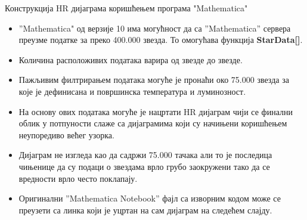 \documentclass[aspectratio=169, xcolor=table, 10pt]{beamer}
\begin{document}
\begin{frame}{Конструкција HR дијаграма коришћењем програма "Mathematica"}
  \begin{itemize}
    \item ”Mathematica" од верзије 10 има могућност да са ”Mathematica” сервера преузме податке за преко 400.000 звезда. То омогућава функција \textbf{StarData[]}.
    \item Количина расположивих података варира од звезде до звезде.
    \item Пажљивим филтрирањем података могуће је пронаћи око 75.000 звезда за које је дефинисана и површинска температура и луминозност.
    \item На основу ових података могуће је нацртати HR дијаграм чији се финални облик у потпуности слаже са дијаграмима који су начињени коришћењем неупоредиво већег узорка.
    \item Дијаграм не изгледа као да садржи 75.000 тачака али то је последица чињенице да су подаци о звездама врло грубо заокружени тако да се вредности врло често поклапају.
    \item Оригинални ”Mathematica Notebook” фајл са изворним кодом може се преузети са линка који је уцртан на сам дијаграм на следећем слајду.
  \end{itemize}
\end{frame}
\end{document}
